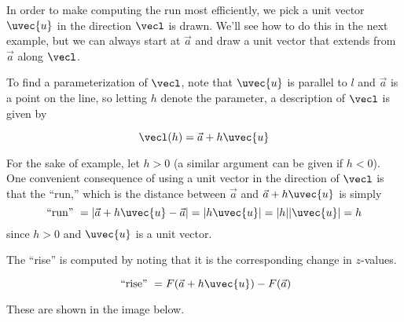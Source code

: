 \documentclass{ximera}
\begin{document}
In order to make computing the run most efficiently, we pick a unit
vector $\uvec{u}$ in the direction $\vecl$ is drawn.  We'll see how to
do this in the next example, but we can always start at $\vec{a}$ and
draw a unit vector that extends from $\vec{a}$ along $\vecl$.

To find a parameterization of $\vecl$, note that $\uvec{u}$ is parallel to
$l$ and $\vec{a}$ is a point on the line, so letting $h$ denote the
parameter, a description of $\vecl$ is given by

\[
\vecl(h) = \vec{a} + h \uvec{u} 
\]

For the sake of example, let $h>0$ (a similar argument can be given if
$h<0$).  One convenient consequence of using a unit vector in the
direction of $\vecl$ is that the ``run,'' which is the distance between
$\vec{a}$ and $\vec{a}+h\uvec{u}$ is simply
\[
\textrm{``run'' } = \left|\vec{a}+h\uvec{u} - \vec{a}\right| = |h
\uvec{u}| = |h| |\uvec{u}| = h
\]
since $h>0$ and $\uvec{u}$ is a unit vector.

The ``rise'' is computed by noting that it is the corresponding change in $z$-values.

\[
\textrm{ ``rise'' } = F(\vec{a}+h\uvec{u})-F(\vec{a})
\] 

These are shown in the image below.
\end{document}
